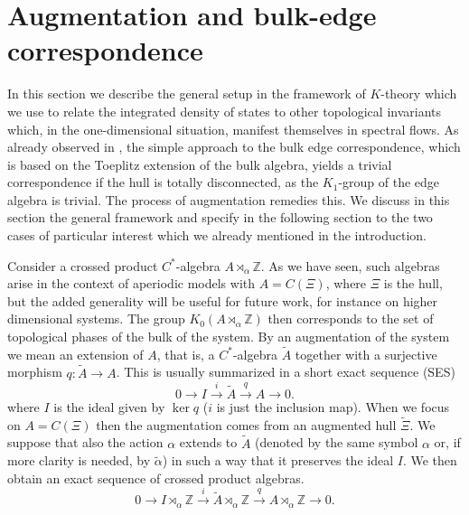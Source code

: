 \documentclass[11pt]{amsart}
\newcommand{\Z}{\mathbb{Z}}
\begin{document}
\section{Augmentation and bulk-edge correspondence}
In this section we describe the general setup in the framework of $K$-theory which we use to relate the integrated density of states to other topological invariants which, in the one-dimensional situation, manifest themselves in spectral flows. 
As already observed in \cite{kellendonk_prodan}, the simple approach to the bulk edge correspondence, which is based on the Toeplitz extension of the bulk algebra, yields a trivial correspondence if the hull is totally disconnected, as the $K_1$-group of the edge algebra is trivial. The process of augmentation remedies this. We discuss in this section the general framework and specify in the following section to the two cases of particular interest which we already mentioned in the introduction.

Consider a crossed product $C^*$-algebra $A\rtimes_\alpha\Z$. As we have seen, such algebras arise in the context of aperiodic models with $A=C(\Xi)$, where $\Xi$ is the hull, but the added generality will be useful for future work, for instance on higher dimensional systems. The group $K_0(A\rtimes_\alpha\Z)$ then corresponds to the set of topological phases of the bulk of the system. By an augmentation of the system we mean an extension  
of $A$, that is, a $C^*$-algebra $\tilde{A}$ together with a surjective morphism $q: \tilde{A}\to A$. This is usually summarized in a short exact sequence (SES)
\begin{equation}\label{eq-SES1}
0 \rightarrow I \xrightarrow{i}  \tilde{A} \xrightarrow{q} A \rightarrow 0.
\end{equation}
where $I$ is the ideal given by $\ker q$ ($i$ is just the inclusion map). When we focus on $A=C(\Xi)$ then the augmentation comes from an augmented hull $\tilde\Xi$. We suppose that also the action $\alpha$ extends to $\tilde A$ (denoted by the same symbol $\alpha$ or, if more clarity is needed, by $\tilde\alpha$) in such a way that it preserves the ideal $I$. We then obtain an exact sequence of crossed product algebras. 
\begin{equation}\label{eqn:firstSES}
	0\rightarrow I\rtimes_\alpha \Z \xrightarrow{i}  \tilde{A}\rtimes_\alpha \Z \xrightarrow{q} A\rtimes_\alpha \Z \rightarrow0.
\end{equation}
\end{document}
